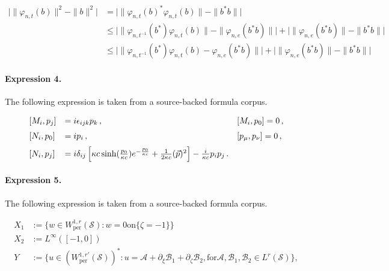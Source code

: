 \documentclass[11pt]{article}
\begin{document}
\begin{align*}\big|\|\varphi_{n,t}(b)\|^2-\|b\|^2\big|&=\big|\|\varphi_{n,t}(b)^*\varphi_{n,t}(b)\|-\|b^*b\|\big|\\&\leq\big|\|\varphi_{n,t^{-1}}(b^*)\varphi_{n,t}(b)\|-\|\varphi_{n,e}(b^*b)\|\big|+\big|\|\varphi_{n,e}(b^*b)\|-\|b^*b\|\big|\\&\leq\big|\|\varphi_{n,t^{-1}}(b^*)\varphi_{n,t}(b)-\varphi_{n,e}(b^*b)\|\big|+\big|\|\varphi_{n,e}(b^*b)\|-\|b^*b\|\big|\end{align*}

\paragraph{Expression 4.} The following expression is taken from a source-backed formula corpus.

\begin{align*}\begin{array}{lll}[ M_i , p_j ] & = i\epsilon_{ijk}p_k\, ,\qquad & [ M_i , p_0 ] =0\, ,\medskip\cr [ N_i , p_0 ] & = i p_i\, , \qquad & [ p_\mu ,p_\nu ] = 0\, ,\medskip\cr[ N_i , p_j ]& =i\delta_{ij}\left[\kappa c\sinh(\frac {p_0}{\kappa c})e^{-\frac{p_0}{\kappa c}} + \frac1{2\kappa c} (\vec p)^2\right] -\frac {i}{\kappa c} p_i p_j\,.&\end{array}\end{align*}

\paragraph{Expression 5.} The following expression is taken from a source-backed formula corpus.

\begin{align*} X_1 & := \{ w \in W_{\mathrm{per}}^{1,r}({\mathcal{S}}) : w = 0 \mathrm{ on } \{ \zeta = -1\} \} \\X_2 &:= L^\infty([-1,0]) \\ Y &:= \{ u \in (W_{\mathrm{per}}^{1,r'}(\mathcal{S}))^* : u = \mathcal{A} + \partial_\xi \mathcal{B}_1 + \partial_\zeta \mathcal{B}_2, \mathrm{ for } \mathcal{A} , \mathcal{B}_1, \mathcal{B}_2 \in L^r({\mathcal{S}}) \}, \end{align*}
\end{document}

